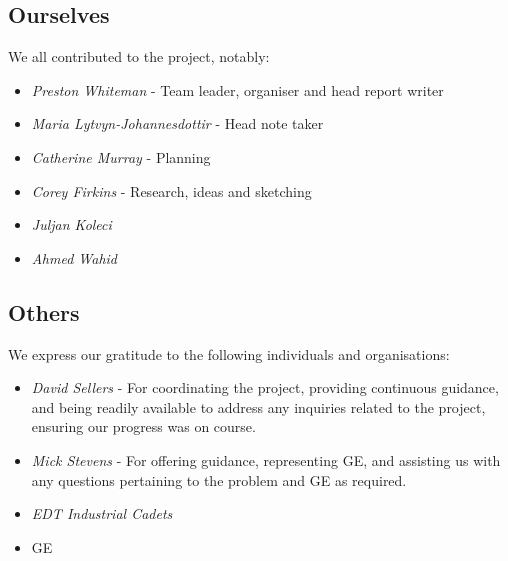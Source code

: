 \documentclass[a4paper,10pt]{article}
\begin{document}
\subsection{Ourselves}
We all contributed to the project, notably:
\begin{itemize}
  \item{\textit{Preston Whiteman} - Team leader, organiser and head report writer}
  \item{\textit{Maria Lytvyn-Johannesdottir} - Head note taker}
  \item{\textit{Catherine Murray} - Planning}
    \subitem{}
  \item{\textit{Corey Firkins} - Research, ideas and sketching}
    \subitem{}
  \item{\textit{Juljan Koleci} }
  \item{\textit{Ahmed Wahid} }
\end{itemize}

\subsection{Others}
We express our gratitude to the following individuals and organisations:
\begin{itemize}
  \item{\textit{David Sellers} - For coordinating the project, providing continuous guidance, and being readily available to address any inquiries related to the project, ensuring our progress was on course.}
  \item{\textit{Mick Stevens} - For offering guidance, representing \gls{GE}, and assisting us with any questions pertaining to the problem and \gls{GE} as required.}
  \item{\textit{EDT Industrial Cadets}}
  \item{\gls{GE}}
\end{itemize}
\pagebreak


\end{document}
